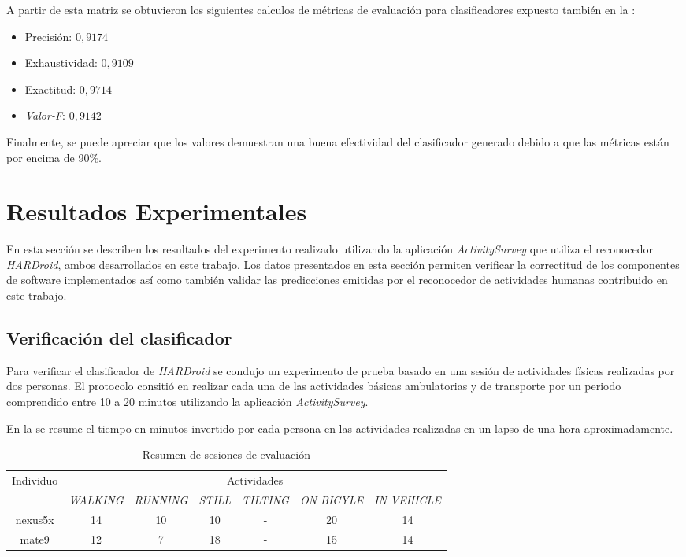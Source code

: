 A partir de esta matriz se obtuvieron los siguientes calculos de métricas
de evaluación para clasificadores expuesto también en la :
\begin{itemize}
\item Precisión: $0,9174$
\item Exhaustividad: $0,9109$
\item Exactitud: $0,9714$
\item \emph{Valor-F}: $0,9142$
\end{itemize}
Finalmente, se puede apreciar que los valores demuestran una buena
efectividad del clasificador generado debido a que las métricas están
por encima de 90\%.

\section{Resultados Experimentales}

\label{sec6:resultados}En esta sección se describen los resultados
del experimento realizado utilizando la aplicación \emph{ActivitySurvey}
que utiliza el reconocedor \emph{HARDroid}, ambos desarrollados en
este trabajo. Los datos presentados en esta sección permiten verificar
la correctitud de los componentes de software implementados así como
también validar las predicciones emitidas por el reconocedor de actividades
humanas contribuido en este trabajo.

\subsection{Verificación del clasificador}

Para verificar el clasificador de \emph{HARDroid }se condujo un experimento
de prueba basado en una sesión de actividades físicas realizadas por
dos personas. El protocolo consitió en realizar cada una de las actividades
básicas ambulatorias y de transporte por un periodo comprendido entre
10 a 20 minutos utilizando la aplicación \emph{ActivitySurvey}. 

En la  se resume el tiempo en minutos invertido
por cada persona en las actividades realizadas en un lapso de una
hora aproximadamente.

\begin{table}[th]
\begin{centering}
\begin{tabular}{|c|c|c|c|c|c|c|}
\hline 
\multirow{2}{*}{Individuo} & \multicolumn{6}{c|}{Actividades}\tabularnewline
\cline{2-7} 
 & \emph{\footnotesize{}WALKING} & \emph{\footnotesize{}RUNNING} & \emph{\footnotesize{}STILL} & \emph{\footnotesize{}TILTING} & \emph{\footnotesize{}ON BICYLE} & \emph{\footnotesize{}IN VEHICLE}\tabularnewline
\hline 
\hline 
nexus5x & 14 & 10 & 10 & - & 20 & 14\tabularnewline
\hline 
mate9 & 12 & 7 & 18 & - & 15 & 14\tabularnewline
\hline 
\end{tabular}
\par\end{centering}
\caption{\label{tab6:vsesiones}Resumen de sesiones de evaluación}
\end{table}


